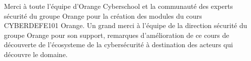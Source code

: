 

\newpage

\thispagestyle{empty}

\begin{center}


\large{Merci à toute l'équipe d'Orange Cyberschool et la communauté des experts sécurité du groupe Orange pour la création des modules du cours CYBERDEFE101 Orange.
Un grand merci à l'équipe de la direction sécurité du groupe Orange pour son support, remarques d'amélioration de ce cours de découverte de l'écosysteme de la cybersécurité à destination des acteurs qui découvre le domaine. 
}



\end{center}




\clearpage 




